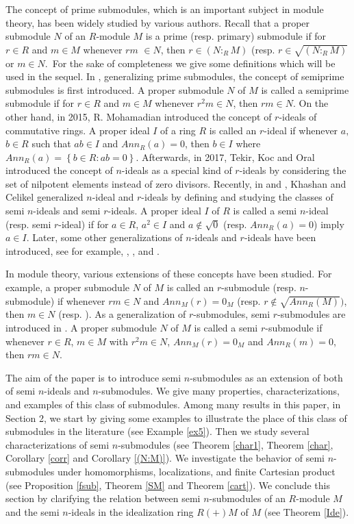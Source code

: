 \documentclass{amsart}%
\theoremstyle{plain}
\numberwithin{equation}{section}
\begin{document}
The concept of prime submodules, which is an important subject in module
theory, has been widely studied by various authors. Recall that a proper
submodule $N$ of an $R$-module $M$ is a prime (resp. primary) submodule if for
$r\in R$ and $m\in M$ whenever $rm$ $\in N$, then $r\in(N:_{R}M)$ (resp.
$r\in\sqrt{(N:_{R}M)}$ or $m\in N$.\ For the sake of completeness we give some
definitions which will be used in the sequel. In \cite{Sar}, generalizing
prime submodules, the concept of semiprime submodules is first introduced. A
proper submodule $N$ of $M$ is called a semiprime submodule if for $r\in R$
and $m\in M$ whenever $r^{2}m\in N$, then $rm\in N.$ On the other hand, in
2015, R. Mohamadian \cite{Moh} introduced the concept of $r$-ideals of
commutative rings. A proper ideal $I$ of a ring $R$ is called an $r$-ideal if
whenever $a,$ $b\in R$ such that $ab\in I$ and $Ann_{R}(a)=0$, then $b\in I$
where $Ann_{R}(a)=\left\{  b\in R:ab=0\right\}  $. Afterwards, in 2017, Tekir,
Koc and Oral \cite{Tek} introduced the concept of $n$-ideals as a special kind
of $r$-ideals by considering the set of nilpotent elements instead of zero
divisors. Recently, in \cite{HE3} and \cite{HE4}, Khashan and Celikel
generalized $n$-ideal and $r$-ideals by defining and studying the classes of
semi $n$-ideals and semi $r$-ideals. A proper ideal $I$ of $R$ is called a
semi $n$-ideal (resp. semi $r$-ideal) if for $a\in R$, $a^{2}\in I$ and
$a\notin\sqrt{0}$ (resp. $Ann_{R}(a)=0$) imply $a\in I$. Later, some other
generalizations of $n$-ideals and $r$-ideals have been introduced, see for
example, \cite{Hani}, \cite{Haniece}, \cite{Haniece2} and \cite{Ece}.

In module theory, various extensions of these concepts have been studied. For
example, a proper submodule $N$ of $M$ is called an $r$-submodule (resp.
$n$-submodule) if whenever $rm\in N$ and $Ann_{M}(r)=0_{M}$ (resp.
$r\notin\sqrt{Ann_{R}(M)})$, then $m\in N$ \cite{Suat} (resp. \cite{Tek}). As
a generalization of $r$-submodules, semi $r$-submodules are introduced in
\cite{HE4}. A proper submodule $N$ of $M$ is called a semi $r$-submodule if
whenever $r\in R$, $m\in M$ with $r^{2}m\in N$, $Ann_{M}(r)=0_{M}$ and
$Ann_{R}(m)=0$, then $rm\in N$.

The aim of the paper is to introduce semi $n$-submodules as an extension of
both of semi $n$-ideals and $n$-submodules. We give many properties,
characterizations, and examples of this class of submodules. Among many
results in this paper, in Section 2, we start by giving some examples to
illustrate the place of this class of submodules in the literature (see
Example \ref{ex5})$.$ Then we study several characterizations of semi
$n$-submodules (see Theorem \ref{char1}, Theorem \ref{char}, Corollary
\ref{corr} and Corollary \ref{(N:M)}). We investigate the behavior of semi
$n$-submodules under homomorphisms, localizations, and finite Cartesian
product (see Proposition \ref{fsub}, Theorem \ref{SM} and Theorem \ref{cart}).
We conclude this section by clarifying the relation between semi
$n$-submodules of an $R$-module $M$ and the semi $n$-ideals in the
idealization ring $R(+)M$ of $M$ (see Theorem \ref{Ide}).
\end{document}
